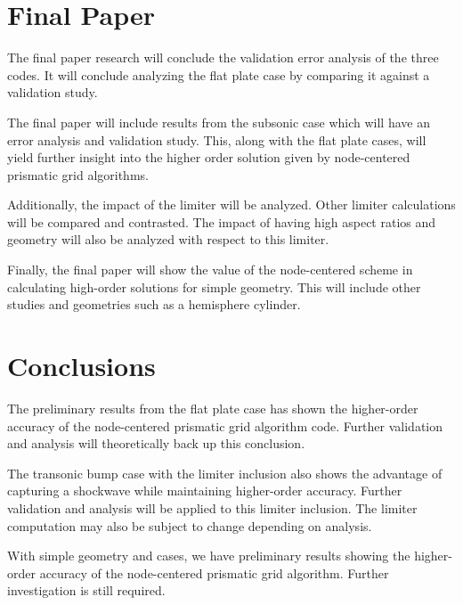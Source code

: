 \documentclass[final]{aiaa-pretty}
\begin{document}
\section{Final Paper}
The final paper research will conclude the validation error analysis of the three codes.  It will conclude analyzing the flat plate case by comparing it against a validation study.  

The final paper will include results from the subsonic case which will have an error analysis and validation study.  This, along with the flat plate cases, will yield further insight into the higher order solution given by node-centered prismatic grid algorithms.  

Additionally, the impact of the limiter will be analyzed.  Other limiter calculations will be compared and contrasted.  The impact of having high aspect ratios and geometry will also be analyzed with respect to this limiter.  

Finally, the final paper will show the value of the node-centered scheme in calculating high-order solutions for simple geometry.  This will include other studies and geometries such as a hemisphere cylinder.  

\section{Conclusions}
The preliminary results from the flat plate case has shown the higher-order accuracy of the node-centered prismatic grid algorithm code.  Further validation and analysis will theoretically back up this conclusion.  

The transonic bump case with the limiter inclusion also shows the advantage of capturing a shockwave while maintaining higher-order accuracy.  Further validation and analysis will be applied to this limiter inclusion. The limiter computation may also be subject to change depending on analysis.  

With simple geometry and cases, we have preliminary results showing the higher-order accuracy of the node-centered prismatic grid algorithm.  Further investigation is still required.





%
\end{document}
